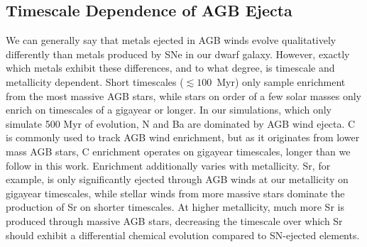\documentclass[twocolumn]{aastex61}
\begin{document}





\subsection{Timescale Dependence of AGB Ejecta}
\label{sec:discussion:metal yields}
We can generally say that metals 
    ejected 
in AGB winds evolve qualitatively differently than metals produced by SNe in 
     our dwarf galaxy. 
However, exactly which metals exhibit these differences, and to what degree, is timescale and metallicity dependent. Short timescales ($\lesssim 100$~Myr) only sample enrichment from the most massive AGB stars, 
     while 
stars on order of a few solar masses 
    only
enrich on timescales of a gigayear or longer. In our simulations, which only 
   simulate 
500 Myr of evolution, N and Ba are dominated 
     by
AGB wind ejecta. C is commonly used to track AGB wind enrichment, but as it originates from lower mass AGB stars, C enrichment operates on gigayear timescales, longer than we follow in this work. Enrichment additionally varies with metallicity. Sr, for example, is only significantly ejected through AGB winds at our metallicity on gigayear timescales, while stellar winds from more massive stars dominate the production of Sr on shorter timescales. At higher metallicity, much more Sr is produced through massive AGB stars, decreasing the timescale over which Sr should exhibit a differential chemical evolution compared to SN-ejected elements.
\end{document}
